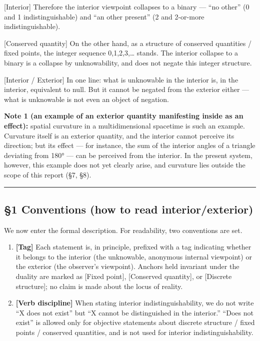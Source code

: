 \documentclass[11pt]{ltjsarticle}
\providecommand{\tightlist}{\setlength{\itemsep}{0pt}\setlength{\parskip}{0pt}}
\begin{document}
{[}Interior{]} Therefore the interior viewpoint collapses to a binary
--- ``no other'' (0 and 1 indistinguishable) and ``an other present'' (2
and 2-or-more indistinguishable).

{[}Conserved quantity{]} On the other hand, as a structure of conserved
quantities / fixed points, the integer sequence 0,1,2,3,\ldots{} stands.
The interior collapse to a binary is a collapse by unknowability, and
does not negate this integer structure.

{[}Interior / Exterior{]} In one line: what is unknowable in the
interior is, in the interior, equivalent to null. But it cannot be
negated from the exterior either --- what is unknowable is not even an
object of negation.

\textbf{Note 1 (an example of an exterior quantity manifesting inside as
an effect):} spatial curvature in a multidimensional spacetime is such
an example. Curvature itself is an exterior quantity, and the interior
cannot perceive its direction; but its effect --- for instance, the sum
of the interior angles of a triangle deviating from 180° --- can be
perceived from the interior. In the present system, however, this
example does not yet clearly arise, and curvature lies outside the scope
of this report (§7, §8).

\begin{center}\rule{0.5\linewidth}{0.5pt}\end{center}

\subsection{§1 Conventions (how to read
interior/exterior)}\label{conventions-how-to-read-interiorexterior}

We now enter the formal description. For readability, two conventions
are set.

\begin{enumerate}
\def\labelenumi{\arabic{enumi}.}
\tightlist
\item
  \textbf{{[}Tag{]}} Each statement is, in principle, prefixed with a
  tag indicating whether it belongs to the interior (the unknowable,
  anonymous internal viewpoint) or the exterior (the observer's
  viewpoint). Anchors held invariant under the duality are marked as
  {[}Fixed point{]}, {[}Conserved quantity{]}, or {[}Discrete
  structure{]}; no claim is made about the locus of reality.
\item
  \textbf{{[}Verb discipline{]}} When stating interior
  indistinguishability, we do not write ``X does not exist'' but ``X
  cannot be distinguished in the interior.'' ``Does not exist'' is
  allowed only for objective statements about discrete structure / fixed
  points / conserved quantities, and is not used for interior
  indistinguishability.
\end{enumerate}
\end{document}
